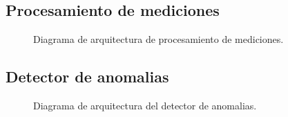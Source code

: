 \documentclass{article}
\theoremstyle{definition}
\theoremstyle{remark}
\begin{document}
\subsection{Procesamiento de mediciones}

\begin{figure}[H]
	\caption{Diagrama de arquitectura de procesamiento de mediciones.}
\end{figure}

\subsection{Detector de anomalias}

\begin{figure}[H]
	\caption{Diagrama de arquitectura del detector de anomalias.}
\end{figure}
\end{document}

